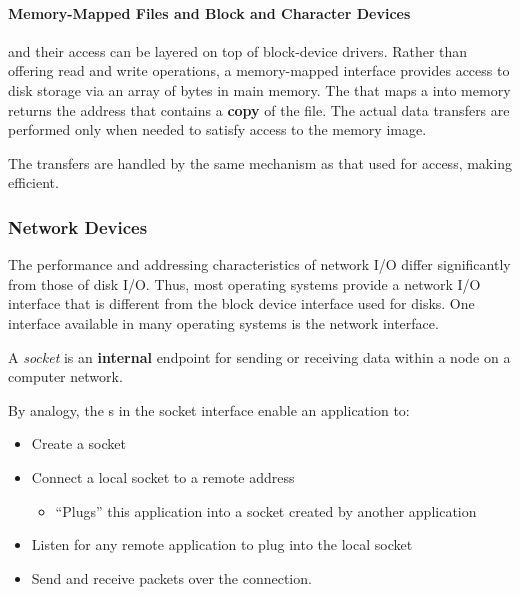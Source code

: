 \paragraph{Memory-Mapped Files and Block and Character Devices}\label{par:Memory_Mapped_Files_Block_Char_Devices}
 and their access can be layered on top of block-device drivers.
Rather than offering read and write operations, a memory-mapped interface provides access to disk storage via an array of bytes in main memory.
The  that maps a  into memory returns the  address that contains a \textbf{copy} of the file.
The actual data transfers are performed only when needed to satisfy access to the memory image.

The transfers are handled by the same mechanism as that used for   access, making  efficient.

\subsubsection{Network Devices}\label{subsubsec:Network_Devices}
The performance and addressing characteristics of network I/O differ significantly from those of disk I/O.
Thus, most operating systems provide a network I/O interface that is different from the block device interface used for disks.
One interface available in many operating systems is the network  interface.

\begin{definition}[Socket]\label{def:Socket}
  A \emph{socket} is an \textbf{internal} endpoint for sending or receiving data within a node on a computer network.

  By analogy, the s in the socket interface enable an application to:
  \begin{itemize}[noitemsep]
  \item Create a socket
  \item Connect a local socket to a remote address
    \begin{itemize}[noitemsep]
    \item ``Plugs'' this application into a socket created by another application
    \end{itemize}
  \item Listen for any remote application to plug into the local socket
  \item Send and receive packets over the connection.
  \end{itemize}
\end{definition}

